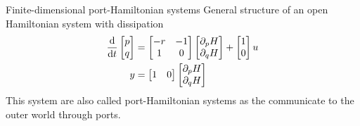 \documentclass[aspectratio=169]{ISAE-Beamer}
\begin{document}
\begin{frame}{Finite-dimensional port-Hamiltonian systems}
General structure of an open Hamiltonian system with dissipation
\begin{align*}
\diff{}{t}
\begin{bmatrix}
p \\ q \\
\end{bmatrix} &= 
\begin{bmatrix}
-r & -1 \\ 
1 & 0 \\
\end{bmatrix}
\begin{bmatrix}
\partial_p{H} \\ 
\partial_q{H} \\
\end{bmatrix}+ 
\begin{bmatrix}
1 \\ 0 \\
\end{bmatrix} u \\
y &= \begin{bmatrix}
1 & 0 \\
\end{bmatrix} \begin{bmatrix}
\partial_p{H} \\ 
\partial_q{H} \\
\end{bmatrix}
\end{align*}
This system are also called port-Hamiltonian systems as the communicate to the outer world through ports.
\end{frame}
\end{document}
